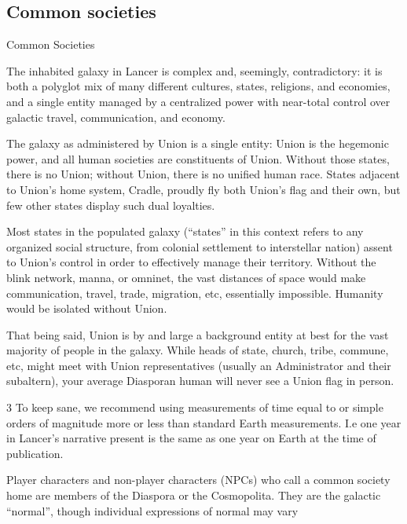    

           
\subsection{Common societies}
Common Societies  

The inhabited galaxy in Lancer is complex and, seemingly, contradictory: it is both a polyglot mix  
of many different cultures, states, religions, and economies, and a single entity managed by a  
centralized power with near-total control over galactic travel, communication, and economy.
 

The galaxy as administered by Union is a single entity: Union is the hegemonic power, and all  
human societies are constituents of Union. Without those states, there is no Union; without  
Union, there is no unified human race. States adjacent to Union’s home system, Cradle, proudly  
fly both Union’s flag and their own, but few other states display such dual loyalties. 
 

Most states in the populated galaxy (“states” in this context refers to any organized social  
structure, from colonial settlement to interstellar nation) assent to Union’s control in order to  
effectively manage their territory. Without the blink network, manna, or omninet, the vast  
distances of space would make communication, travel, trade, migration, etc, essentially  
impossible. Humanity would be isolated without Union. 
 

That being said, Union is by and large a background entity at best for the vast majority of people  
in the galaxy. While heads of state, church, tribe, commune, etc, might meet with Union  
representatives (usually an Administrator and their subaltern), your average Diasporan human will  
never see a Union flag in person. 
 

3 To keep sane, we recommend using measurements of time equal to or simple orders of magnitude more  
or less than standard Earth measurements. I.e one year in Lancer’s narrative present is the same as one  
year on Earth at the time of publication.  

                                                                                                                       


Player characters and non-player characters (NPCs) who call a common society home are  
members of the Diaspora or the Cosmopolita. They are the galactic “normal”, though individual  
expressions of normal may vary 
 

